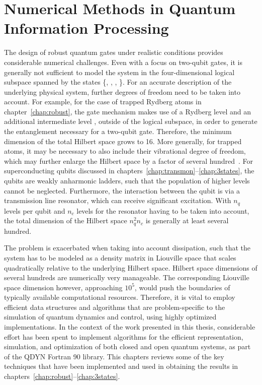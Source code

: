 \chapter{Numerical Methods in Quantum Information Processing}
\label{chap:numerics}

The  design of robust quantum gates under realistic conditions provides
considerable numerical challenges.
Even with a focus on two-qubit gates, it is generally not sufficient to model
the system in the four-dimensional logical subspace spanned by the states
\{, , , \}. For an accurate description of the
underlying physical system, further degrees of freedom need to be taken
into account. For example, for the case of trapped Rydberg atoms in
chapter~\ref{chap:robust}, the gate mechanism makes use of a Rydberg
level  and an additional intermediate level , outside of the logical
subspace, in order to generate the entanglement necessary for a two-qubit gate.
Therefore, the minimum dimension of the total Hilbert space grows to 16. More
generally, for trapped atoms, it may be necessary to also include
their vibrational degree of freedom, which may further enlarge the Hilbert space
by a factor of several hundred~\cite{GoerzJPB11, GoerzDipl10}. For
superconducting qubits discussed in
chapters~\ref{chap:transmon}--\ref{chap:3states}, the qubits are weakly
anharmonic ladders, such that the population of higher levels cannot be
neglected. Furthermore, the interaction between the qubit is via a transmission
line resonator, which can receive significant excitation. With $n_q$ levels per
qubit and $n_c$ levels for the resonator having to be taken into account, the
total dimension of the Hilbert space $n_q^2 n_c$ is generally at least several
hundred.

The problem is exacerbated when taking into account dissipation, such that the
system has to be modeled as a density matrix in Liouville space that scales
quadratically relative to the underlying Hilbert space. Hilbert space
dimensions of several hundreds are numerically very manageable.
The corresponding Liouville space dimension however, approaching $10^5$, would push the
boundaries of typically available computational resources.
Therefore, it is vital to employ efficient data structures and algorithms that
are problem-specific to the simulation of quantum dynamics and control, using
highly optimized implementations.
In the context of the work presented in this thesis, considerable effort has
been spent to implement algorithms for the efficient representation, simulation,
and optimization of both closed and open quantum systems, as part of the QDYN
Fortran 90 library. This chapters reviews some of the key techniques that have
been implemented and used in obtaining the results in
chapters~\ref{chap:robust}--\ref{chap:3states}.


